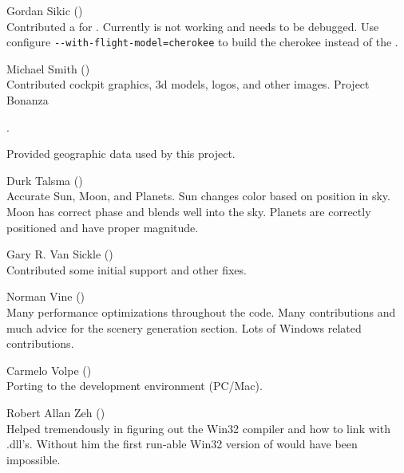 \noindent Gordan Sikic ()\\
  Contributed a  for .  Currently is not
  working and needs to be debugged.  Use configure
  \texttt{-$\!$-with-flight-model=cherokee}
  to build the cherokee instead of the .
 \medskip

\noindent Michael Smith ()\\
  Contributed cockpit graphics, 3d models, logos, and other images.
  Project Bonanza

  .
 \medskip

\noindent


 \noindent
  Provided geographic data used by this project.
 \medskip

\noindent Durk Talsma ()\\
  Accurate Sun, Moon, and Planets.  Sun changes color based on
  position in sky. Moon has correct phase and blends well into the
  sky.  Planets are correctly positioned and have proper magnitude.
 \medskip

\noindent Gary R. Van Sickle
()\\
  Contributed some initial  support and other fixes.
 \medskip

\noindent Norman Vine ()\\
  Many performance optimizations throughout the code.  Many contributions
  and much advice for the scenery generation section.  Lots of Windows
  related contributions.
\medskip

\noindent Carmelo Volpe ()\\
  Porting \FlightGear to the  development environment
  (PC/Mac).
 \medskip

\noindent Robert Allan Zeh ()\\
  Helped tremendously in figuring out the  Win32 compiler and
  how to link with .dll's.  Without him the first run-able Win32
  version of \FlightGear would have been impossible.

